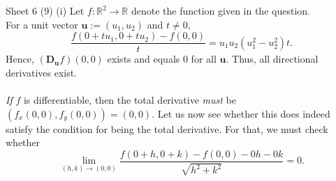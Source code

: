 \documentclass[handout, aspectratio=169]{beamer}
\begin{document}
\begin{frame}{Sheet 6}
	(9) (i) Let $f:\mathbb{R}^2 \to \mathbb{R}$ denote the function given in the question.\\
	For a unit vector $\textbf{u} := (u_1, u_2)$ and $t \neq 0,$
	\[\frac{f\left(0+t u_{1}, 0+t u_{2}\right)-f(0,0)}{t} = u_1u_2(u_1^2 - u_2^2)t.\]
	Hence, $\left(\mathbf{D_u} f\right)(0,0)$ exists and equals $0$ for all $\textbf{u}.$ Thus, all directional derivatives exist.\\~\\
	\emph{If} $f$ is differentiable, then the total derivative \emph{must} be $(f_x(0, 0), f_y(0, 0)) = (0, 0).$ Let us now see whether this does indeed satisfy the condition for being the total derivative. For that, we must check whether
	\[\lim _{(h, k) \rightarrow(0,0)} \frac{f\left(0+h, 0+k\right)-f\left(0, 0\right)-0 h-0 k}{\sqrt{h^{2}+k^{2}}}=0.\]
\end{frame}
\end{document}
